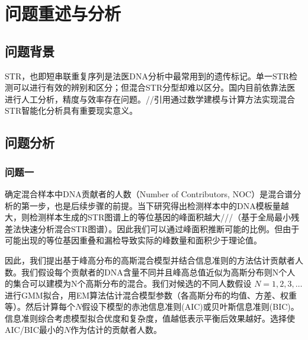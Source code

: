 \chapter[\hspace{0pt}问题重述与分析]{{\heiti{}\hspace{0pt}问题重述与分析}}\label{chapter: 问题重述与分析}


\section[\hspace{-2pt}问题背景]{{\heiti{} \hspace{-8pt}问题背景}}\label{section1: 问题背景}
STR，也即短串联重复序列是法医DNA分析中最常用到的遗传标记。单一STR检测可以进行有效的辨别和区分；但混合STR分型却难以区分。国内目前依靠法医进行人工分析，精度与效率存在问题。//引用通过数学建模与计算方法实现混合STR智能化分析具有重要现实意义。

\section[\hspace{-2pt}问题分析]{{\heiti{} \hspace{-8pt}问题分析}}\label{section1: 问题分析}

\subsection[\hspace{-2pt}问题一]{{\heiti{} \hspace{-8pt}问题一}}\label{section1: 问题一}
 确定混合样本中DNA贡献者的人数（Number of Contributors, NOC）是混合谱分析的第一步，也是后续步骤的前提。当下研究得出检测样本中的DNA模板量越大，则检测样本生成的STR图谱上的等位基因的峰面积越大///（基于全局最小残差法快速分析混合STR图谱）。因此我们可以通过峰面积推断可能的比例。但由于可能出现的等位基因重叠和漏检导致实际的峰数量和面积少于理论值。
 
 因此，我们提出基于峰高分布的高斯混合模型并结合信息准则的方法估计贡献者人数。我们假设每个贡献者的DNA含量不同并且峰高总值近似为高斯分布则N个人的集合可以建模为N个高斯分布的混合。我们对候选的不同人数假设  $ N=1,2,3,\dots $  进行GMM拟合，用EM算法估计混合模型参数（各高斯分布的均值、方差、权重等）。然后计算每个$N$假设下模型的赤池信息准则(AIC)或贝叶斯信息准则(BIC)。信息准则综合考虑模型拟合优度和复杂度，值越低表示平衡后效果越好。选择使AIC/BIC最小的$N$作为估计的贡献者人数。

